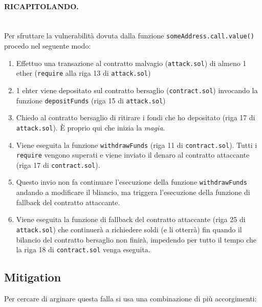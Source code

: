 \paragraph{RICAPITOLANDO.}\ \\
Per sfruttare la vulnerabilità dovuta dalla funzione \verb|someAddress.call.value()|
procedo nel seguente modo:

\begin{enumerate}
      \item Effettuo una transazione al contratto malvagio (\verb|attack.sol|) di almeno
            1 ether (\verb|require| alla riga 13 di \verb|attack.sol|)
      \item 1 ehter viene depositato sul contratto bersaglio (\verb|contract.sol|) invocando
            la funzione \verb|depositFunds| (riga 15 di \verb|attack.sol|)
      \item Chiedo al contratto bersaglio di ritirare i fondi che ho depositato
            (riga 17 di \verb|attack.sol|). È proprio qui che inizia la \textit{magia}.
      \item  Viene eseguita la funzione \verb|withdrawFunds| (riga 11 di \verb|contract.sol|).
            Tutti i \verb|require| vengono superati e viene inviato il denaro al contratto attaccante
            (riga 17 di \verb|contract.sol|).
      \item Questo invio non fa continuare l'esecuzione della funzione \verb|withdrawFunds|
            andando a modificare il bliancio, ma triggera l'esecuzione della funzione
            di fallback del contratto attaccante.
      \item  Viene eseguita la funzione di fallback del contratto attaccante
            (riga 25 di \verb|attack.sol|) che continuerà a richiedere soldi
            (e li otterrà) fin
            quando il bilancio del contratto bersaglio non finirà, impedendo
            per tutto il tempo che la riga 18 di \verb|contract.sol| venga eseguita.
\end{enumerate}

\subsection{Mitigation}

Per cercare di arginare questa falla si usa una combinazione di più accorgimenti:

